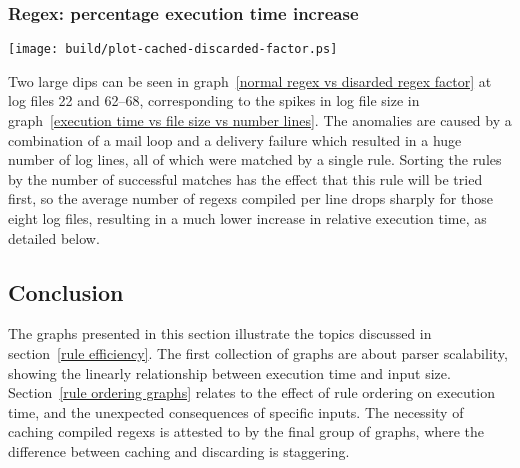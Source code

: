 \documentclass[a4paper,12pt,draft]{article}
\begin{document}
\subsubsection{Regex: percentage execution time increase}
\label{normal regex vs disarded regex factor}
\texttt{[image: build/plot-cached-discarded-factor.ps]}

Two large dips can be seen in graph~\ref{normal regex vs disarded regex
factor} at log files 22 and 62--68, corresponding to the spikes in log file
size in graph~\ref{execution time vs file size vs number lines}.  The
anomalies are caused by a combination of a mail loop and a delivery failure
which resulted in a huge number of log lines, all of which were matched by
a single rule.  Sorting the rules by the number of successful matches has
the effect that this rule will be tried first, so the average number of
regexs compiled per line drops sharply for those eight log files, resulting
in a much lower increase in relative execution time, as detailed below.




\subsection{Conclusion}

The graphs presented in this section illustrate the topics discussed in
section~\ref{rule efficiency}.  The first collection of graphs are about
parser scalability, showing the linearly relationship between execution
time and input size.  Section~\ref{rule ordering graphs} relates to the
effect of rule ordering on execution time, and the unexpected consequences
of specific inputs.  The necessity of caching compiled regexs is attested
to by the final group of graphs, where the difference between caching and
discarding is staggering.
\end{document}
